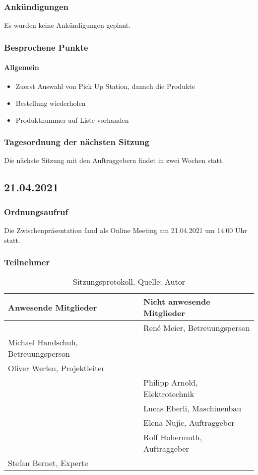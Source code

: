 \subsubsection{Ankündigungen}
Es wurden keine Ankündigungen geplant.
\subsubsection{Besprochene Punkte}
\paragraph{Allgemein}
\begin{itemize}
	\item Zuerst Auswahl von Pick Up Station, danach die Produkte
	\item Bestellung wiederholen
	\item Produktnummer auf Liste vorhanden
\end{itemize}
\subsubsection{Tagesordnung der nächsten Sitzung}
Die nächste Sitzung mit den Auftraggebern findet in zwei Wochen statt. 
\newpage
\subsection{21.04.2021}
\subsubsection{Ordnungsaufruf}
Die Zwischenpräsentation fand als Online Meeting am 21.04.2021 um 14:00 Uhr statt.
\subsubsection{Teilnehmer}
\begin{table}[H]
	\setlength\extrarowheight{2pt} %
	\begin{tabularx}{\textwidth}{|X|X|}
		\hline
		\textbf{Anwesende Mitglieder} &  \textbf{Nicht anwesende Mitglieder} \\
		\hline
		& René Meier, Betreuungsperson   \\
		 Michael Handschuh, Betreuungsperson  & \\
		Oliver Werlen, Projektleiter &  \\
		&Philipp Arnold, Elektrotechnik  \\
		& Lucas Eberli, Maschinenbau \\
		&Elena Nujic, Auftraggeber  \\
		&Rolf Hohermuth, Auftraggeber  \\
		Stefan Bernet, Experte &\\
		\hline
	\end{tabularx}
	\caption{ \label{tbl: Teilnehmerliste vom 21.04.2021}Sitzungsprotokoll, Quelle: Autor}
\end{table}
